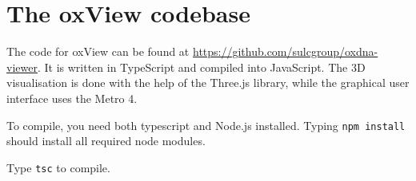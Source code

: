 \chapter{The oxView codebase}

The code for oxView can be found at \url{https://github.com/sulcgroup/oxdna-viewer}. It is written in TypeScript and compiled into JavaScript. The 3D visualisation is done with the help of the Three.js library, while the graphical user interface uses the Metro 4. 

To compile, you need both typescript and Node.js installed. Typing \verb|npm install| should install all required node modules.

Type \verb|tsc| to compile. 

\minitoc

